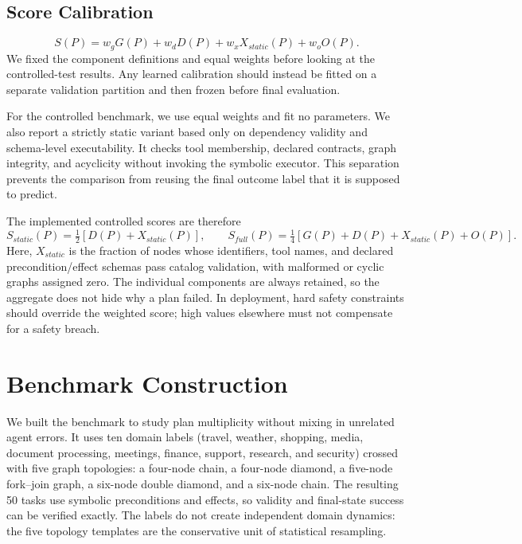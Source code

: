 \documentclass[10pt]{article}
\begin{document}
\subsection{Score Calibration}
\begin{equation}
S(P)=w_gG(P)+w_dD(P)+w_xX_{static}(P)+w_oO(P).
\end{equation}
We fixed the component definitions and equal weights before looking at the
controlled-test results. Any learned calibration should instead be fitted on a
separate validation partition and then frozen before final evaluation.

For the controlled benchmark, we use equal weights and fit no parameters. We also report a
strictly static variant based only on dependency validity and schema-level
executability. It checks tool membership, declared contracts, graph integrity,
and acyclicity without invoking the symbolic executor. This separation prevents
the comparison from reusing the final outcome label that it is supposed to
predict.

The implemented controlled scores are therefore
\begin{equation}
S_{static}(P)=\tfrac{1}{2}\left[D(P)+X_{static}(P)\right],\qquad
S_{full}(P)=\tfrac{1}{4}\left[G(P)+D(P)+X_{static}(P)+O(P)\right].
\end{equation}
Here, $X_{static}$ is the fraction of nodes whose identifiers, tool names, and
declared precondition/effect schemas pass catalog validation, with malformed or
cyclic graphs assigned zero. The individual components are always retained, so the aggregate does not hide
why a plan failed. In deployment, hard safety constraints should override the
weighted score; high values elsewhere must not compensate for a safety breach.

\section{Benchmark Construction}
We built the benchmark to study plan multiplicity without mixing in unrelated
agent errors. It uses ten domain labels (travel, weather, shopping,
media, document processing, meetings, finance, support, research, and
security) crossed with five graph topologies: a four-node chain, a four-node
diamond, a five-node fork--join graph, a six-node double diamond, and a
six-node chain. The resulting 50 tasks use symbolic preconditions and effects,
so validity and final-state success can be verified exactly. The labels do not
create independent domain dynamics: the five topology templates are the
conservative unit of statistical resampling.
\end{document}
